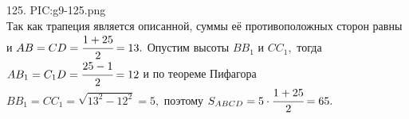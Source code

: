 125. {{PIC:g9-125.png}}\\
Так как трапеция является описанной, суммы её противоположных сторон равны и $AB=CD=\cfrac{1+25}{2}=13.$ Опустим высоты $BB_1$ и $CC_1,$ тогда $AB_1=C_1D=\cfrac{25-1}{2}=12$ и по теореме Пифагора $BB_1=CC_1=\sqrt{13^2-12^2}=5,$ поэтому $S_{ABCD}=5\cdot\cfrac{1+25}{2}=65.$\newpage\noindent
